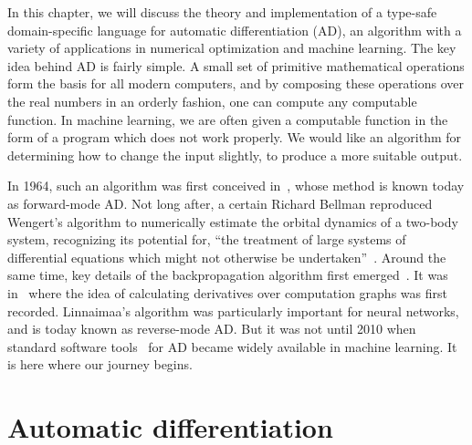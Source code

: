 \documentclass[12pt,initial,twoside,maitrise]{dms}
\numberwithin{equation}{section}
\numberwithin{table}{chapter}
\numberwithin{figure}{chapter}
\begin{document}
In this chapter, we will discuss the theory and implementation of a type-safe domain-specific language for automatic differentiation (AD), an algorithm with a variety of applications in numerical optimization and machine learning. The key idea behind AD is fairly simple. A small set of primitive mathematical operations form the basis for all modern computers, and by composing these operations over the real numbers in an orderly fashion, one can compute any computable function. In machine learning, we are often given a computable function in the form of a program which does not work properly. We would like an algorithm for determining how to change the input slightly, to produce a more suitable output.

In 1964, such an algorithm was first conceived in~\citet{wengert1964simple}, whose method is known today as forward-mode AD. Not long after, a certain Richard Bellman reproduced Wengert's algorithm to numerically estimate the orbital dynamics of a two-body system, recognizing its potential for, ``the treatment of large systems of differential equations which might not otherwise be undertaken''~\citep{bellman1965wengert}. Around the same time, key details of the backpropagation algorithm first emerged~\citep{dreyfus1990artificial}. It was in~\citet{linnainmaa1970representation} where the idea of calculating derivatives over computation graphs was first recorded. Linnaimaa's algorithm was particularly important for neural networks, and is today known as reverse-mode AD. But it was not until 2010 when standard software tools~\citep{bergstra2010theano} for AD became widely available in machine learning. It is here where our journey begins.

\section{Automatic differentiation}\label{sec:automatic-differentiation}
\end{document}
